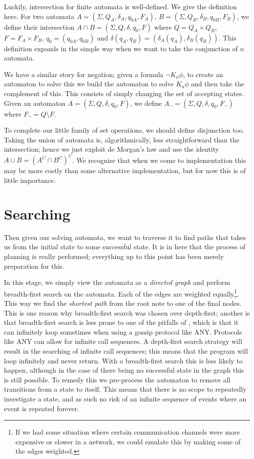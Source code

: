 \documentclass[ %
                    author={Leo Poulson},
                supervisor={Dr. Steven Ramsay},
                    degree={BSc},
                     title={Epistemic Planning for the Dynamic Gossip problem},
                  subtitle={},
                      year={2019} ]{dissertation}
\begin{document}
Luckily, intersection for finite automata is well-defined. We give the
definition here. For two automata $A = (\Sigma, Q_A, \delta_A, q_{0A}, F_A)$, $B
= (\Sigma, Q_B, \delta_B, q_{0B}, F_B)$, we define their intersection $A \cap B
= (\Sigma, Q, \delta, q_0, F)$ where $Q = Q_A \times Q_B$, $F = F_A \times F_B$,
$q_0 = (q_{0A}, q_{0B})$ and $\delta(q_A, q_B) = (\delta_A(q_A),
\delta_B(q_B))$. This definition expands in the simple way when we want to take
the conjunction of $n$ automata.

We have a similar story for negation; given a formula $\neg K_a \phi$, to create
an automaton to solve this we build the automaton to solve $K_a \phi$ and then
take the complement of this. This consists of simply changing the set of
accepting states. Given an automaton $A = (\Sigma, Q, \delta, q_0, F)$, we define
$A_\neg = (\Sigma, Q, \delta, q_0, F_\neg)$ where $F_\neg = Q \setminus F$.

To complete our little family of set operations, we should define disjunction
too. Taking the union of automata is, algorithmically, less straightforward than
the intersection; hence we just exploit de Morgan's law and use the identity $A
\cup B = (A^C \cap B^C)^C$. We recognise that when we come to implementation
this may be more costly than some alternative implementation, but for now this
is of little importance. 

\section{Searching}

Then given our solving automata, we want to traverse it to find paths that takes
us from the initial state to some successful state. It is in here that the
process of planning is really performed; everything up to this point has been
merely preparation for this. 

In this stage, we simply view the automata as a \emph{directed graph} and
perform breadth-first search on the automata. Each of the edges are weighted
equally\footnote{If we had some situation where certain communication channels
  were more expensive or slower in a network, we could emulate this by making
  some of the edges weighted.}. This way we find the \emph{shortest path} from
the root note to one of the final nodes. This is one reason why breadth-first
search was chosen over depth-first; another is that breadth-first search is
less prone to one of the pitfalls of \cite{GithubGossip}, which is that it can
infinitely loop sometimes when using a gossip protocol like \textsf{ANY}.
Protocols like \textsf{ANY} can allow for infinite call sequences. A depth-first
search strategy will result in the searching of infinite call sequences; this
means that the program will loop infinitely and never return. With a
breadth-first search this is less likely to happen, although in the case of
there being no successful state in the graph this is still possible. To remedy
this we pre-process the automaton to remove all transitions from a state to
itself. This means that there is no scope to repeatedly investigate a state, and
as such no risk of an infinite sequence of events where an event is repeated
forever.
\end{document}
